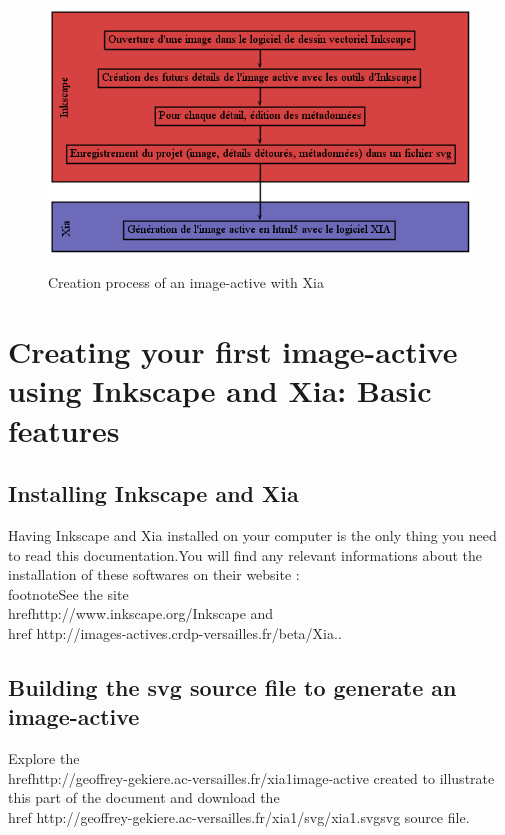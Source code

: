 \begin{figure}[htp]
 \centering
 \caption{Creation process of an image-active with  Xia}
 \includegraphics[width=1\textwidth]{images/workflow_xia}
 \label{workflow_xia}
\end{figure}

\section{Creating your first image-active using Inkscape and Xia: Basic features}

\subsection{Installing Inkscape and Xia}

Having Inkscape and Xia installed on your computer is the only thing you need 
to read this documentation.You will find any relevant informations about the 
installation of these softwares on their website :\\footnote{See the site 
\\href{http://www.inkscape.org/}{Inkscape} and \\href
{http://images-actives.crdp-versailles.fr/beta/}{Xia}.}.

\subsection{Building the svg source file to generate an image-active}\label{preparation_svg}

Explore the \\href{http://geoffrey-gekiere.ac-versailles.fr/xia1}{image-active 
created to illustrate this part of the document} and download the \\href
{http://geoffrey-gekiere.ac-versailles.fr/xia1/svg/xia1.svg}{svg source file}.

